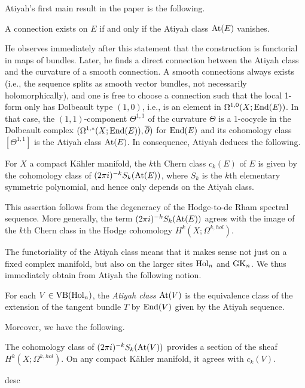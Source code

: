 Atiyah's first main result in the paper is the following.

\begin{prop}
A connection exists on $E$ if and only if the Atiyah class ${\rm At}(E)$ vanishes.
\end{prop}

He observes immediately after this statement that the construction is
functorial in maps of bundles. Later, he finds a direct connection
between the Atiyah class and the curvature of a smooth connection. A
smooth connections always exists (i.e., the sequence splits as smooth
vector bundles, not necessarily holomorphically), and one is free to
choose a connection such that the local 1-form only has
Dolbeault type $(1,0)$, i.e., is an element in $\Omega^{1,0}(X; {\rm End}(E))$. In that case, the $(1,1)$-component
$\Theta^{1,1}$ of the curvature $\Theta$ is a 1-cocycle in the
Dolbeault complex $(\Omega^{1,*}(X ; {\rm End}(E)), \overline{\partial})$ for ${\rm End}(E)$ and its cohomology class $[\Theta^{1,1}]$ is the Atiyah class ${\rm At}(E)$. In consequence, Atiyah deduces the following.

\begin{prop}
For $X$ a compact K\"ahler manifold, the $k$th Chern class $c_k(E)$ of $E$ is given by the cohomology class of $(2\pi i)^{-k} S_k({\rm At}(E))$, 
where $S_k$ is the $k$th elementary symmetric polynomial, and hence only depends on the Atiyah class.
\end{prop}

This assertion follows from the degeneracy of the Hodge-to-de Rham
spectral sequence. More generally, the term $(2\pi i)^{-k}
S_k({\rm At}(E))$ agrees with the image of the $k$th Chern class in the
Hodge cohomology $H^k(X ; \Omega^{k,hol})$.

The functoriality of the Atiyah class means that it makes sense not just on a fixed complex manifold, but also on the larger sites ${\rm Hol}_n$ and ${\rm GK}_n$. 
We thus immediately obtain from Atiyah the following notion.

\begin{dfn}
For each $V \in {\rm VB}({\rm Hol}_n)$, the {\em Atiyah class} ${\rm At}(V)$ is the equivalence class of the extension of the tangent bundle $T$ by ${\rm End}(V)$ given by the Atiyah sequence.
\end{dfn}

Moreover, we have the following.

\begin{lem}
The cohomology class of $(2\pi i)^{-k} S_k({\rm At}(V))$ provides a section
of the sheaf $H^k(X ; \Omega^{k,hol})$. On any compact K\"ahler manifold, it agrees with $c_k(V)$.
\end{lem}
desc

